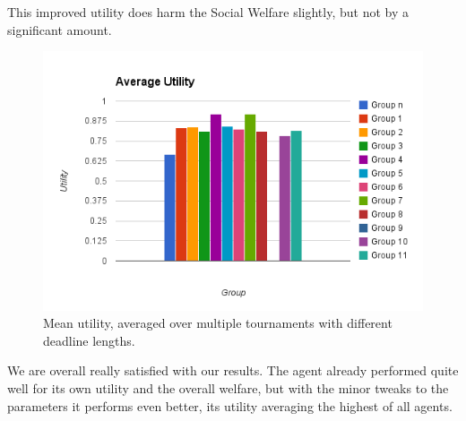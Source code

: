 \documentclass[a4,11pt]{scrartcl}
\begin{document}
This improved utility does harm the Social Welfare slightly, but not by a significant amount.

\begin{figure}[ht]
    \centering
    \includegraphics[width=\textwidth]{image.png}
    \caption{Mean utility, averaged over multiple tournaments with different deadline lengths.}
    \label{fig:utility}
\end{figure}


We are overall really satisfied with our results. The agent already performed quite well for its own utility and the overall welfare, but with the minor tweaks to the parameters it performs even better, its utility averaging the highest of all agents.
\label{sec:finalresults}
\end{document}
